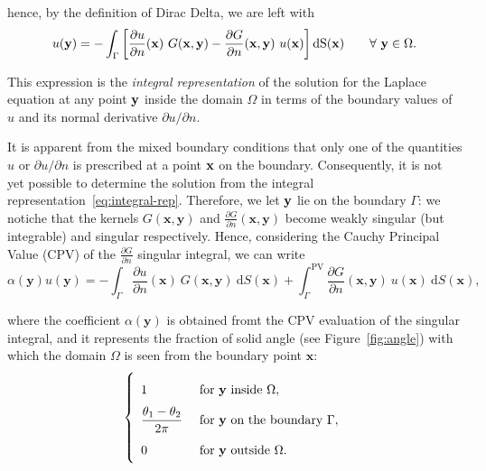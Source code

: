 hence, by the definition of Dirac Delta, we are left with
\begin{equation}
\label{eq:integral-rep}
u(\yv) = - \int_{\Gamma} \left[ \frac{\partial u}{\partial n}(\xv)\ G(\xv,\yv) - \frac{\partial G}{\partial n}(\xv,\yv)\ u(\xv) \right]\!\! \dS(\xv) \qquad \forall \yv \in\Omega.
\end{equation}

This expression is the \emph{integral representation} of the solution for the Laplace equation at any point $\mathbf{y}$ inside the domain $\Omega$ in terms of the boundary values of $u$ and its normal derivative ${\partial u}/{\partial n}$.

It is apparent from the mixed boundary conditions that only one of the quantities $u$ or $\partial u/\partial n$ is prescribed at a point $\mathbf{x}$ on the boundary.  Consequently, it is not yet possible to determine the solution from the integral representation~\eqref{eq:integral-rep}. Therefore, we let $\mathbf{y}$ lie on the boundary $\Gamma$: we notiche that the kernels $G(\mathbf{x},\mathbf{y})$ and $\frac{\partial G}{\partial n}(\mathbf{x},\mathbf{y})$ become weakly singular (but integrable) and singular respectively. Hence, considering the Cauchy Principal Value (CPV) of the $\frac{\partial G}{\partial n}$ singular integral, we can write
\begin{equation}
\label{eq:solid-angle}
\alpha(\mathbf{y})u(\mathbf{y}) =- \displaystyle\int_{\Gamma} \frac{\partial u}{\partial n}(\mathbf{x})\ G(\mathbf{x},\mathbf{y})\ \mathrm{d}S(\mathbf{x}) + \int_{\Gamma}^{\text{PV}} \frac{\partial G}{\partial n}(\mathbf{x},\mathbf{y})\ u(\mathbf{x}) \ \mathrm{d}S(\mathbf{x}),
\end{equation}

where the coefficient $\alpha(\mathbf{y})$ is obtained fromt the CPV evaluation of the singular integral, and it represents the fraction of solid angle (see Figure~\ref{fig:angle}) with which the domain $\Omega$ is seen from the boundary point $\mathbf{x}$:
\begin{equation*}
\left\{
{\renewcommand*{\arraystretch}{2}
\begin{array}{ll}
1 &\text{ for } \mathbf{y} \text{ inside } \Omega,\\
\dfrac{\theta_1-\theta_2}{2\pi} &\text{ for } \mathbf{y} \text{ on the boundary } \Gamma, \\
0 &\text{ for } \mathbf{y} \text{ outside } \Omega.
\end{array}}
\right.
\end{equation*}

